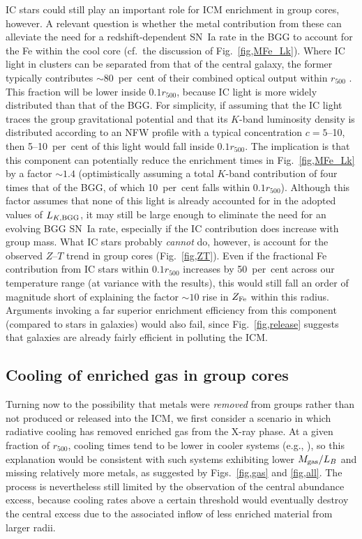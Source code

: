 \documentclass[useAMS,usenatbib]{mn2e}
\begin{document}
IC stars could still play an important role for ICM enrichment in
group cores, however.  A relevant question is whether the metal
contribution from these can alleviate the need for a
redshift-dependent SN~Ia rate in the BGG to account for the Fe within
the cool core (cf.\ the discussion of Fig.~\ref{fig,MFe_Lk}). Where IC
light in clusters can be separated from that of the central galaxy,
the former typically contributes $\sim 80$~per~cent of their combined
optical output within $r_{500}$ \citep{siva09}. This fraction will be
lower inside $0.1r_{500}$, because IC light is more widely distributed
than that of the BGG. For simplicity, if assuming that the IC light
traces the group gravitational potential and that its $K$-band
luminosity density is distributed according to an NFW profile
\citep*{nava97} with a typical concentration $c= 5$--10, then
5--10~per~cent of this light would fall inside $0.1 r_{500}$. The
implication is that this component can potentially reduce the
enrichment times in Fig.~\ref{fig,MFe_Lk} by a factor $\sim 1.4$
(optimistically assuming a total $K$-band contribution of four times
that of the BGG, of which 10~per~cent falls within
$0.1r_{500}$). Although this factor assumes that none of this light is
already accounted for in the adopted values of $L_{K,\rm BGG}$, it may
still be large enough to eliminate the need for an evolving BGG SN~Ia
rate, especially if the IC contribution does increase with group
mass. What IC stars probably {\em cannot} do, however, is account for
the observed $Z$--$T$ trend in group cores (Fig.~\ref{fig,ZT}). Even
if the fractional Fe contribution from IC stars within $0.1r_{500}$
increases by 50~per~cent across our temperature range (at variance
with the \citealt{gonz07} results), this would still fall an order of
magnitude short of explaining the factor $\sim 10$ rise in $Z_{\rm
Fe}$ within this radius. Arguments invoking a far superior enrichment
efficiency from this component (compared to stars in galaxies) would
also fail, since Fig.~\ref{fig,release} suggests that galaxies are
already fairly efficient in polluting the ICM.





\subsection{Cooling of enriched gas in group cores}

Turning now to the possibility that metals were {\em removed} from
groups rather than not produced or released into the ICM, we first
consider a scenario in which radiative cooling has removed enriched
gas from the X-ray phase. At a given fraction of $r_{500}$, cooling
times tend to be lower in cooler systems (e.g., \citealt{sand06}), so
this explanation would be consistent with such systems exhibiting
lower $M_{\rm gas}/L_B$ and missing relatively more metals, as
suggested by Figs.~\ref{fig,gas} and \ref{fig,all}. The process is
nevertheless still limited by the observation of the central abundance
excess, because cooling rates above a certain threshold would
eventually destroy the central excess due to the associated inflow of
less enriched material from larger radii.
\end{document}
